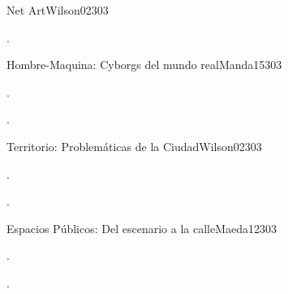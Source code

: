 \begin{syllabus}
\begin{unit}{Net Art}{}{Wilson02}{30}{3}
   \begin{learningoutcomes}
      \item . 
   \end{learningoutcomes}
\end{unit}

\begin{unit}{Hombre-Maquina: Cyborgs del mundo real}{}{Manda15}{30}{3}
   \begin{topics}
      \item . 
   \end{topics}

   \begin{learningoutcomes}
      \item . 
   \end{learningoutcomes}
\end{unit}

\begin{unit}{Territorio: Problemáticas de la Ciudad}{}{Wilson02}{30}{3}
   \begin{topics}
      \item .
   \end{topics}

   \begin{learningoutcomes}
      \item .
   \end{learningoutcomes}
\end{unit}

\begin{unit}{Espacios Públicos: Del escenario a la calle}{}{Maeda12}{30}{3}
   \begin{topics}
      \item . 
   \end{topics}

   \begin{learningoutcomes}
      \item .
   \end{learningoutcomes}
\end{unit}


\begin{coursebibliography}
\end{coursebibliography}
\end{syllabus}
